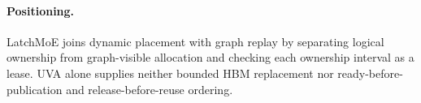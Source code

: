 \paragraph{Positioning.}
LatchMoE joins dynamic placement with graph replay by separating logical
ownership from graph-visible allocation and checking each ownership
interval as a lease. UVA alone supplies neither bounded HBM replacement nor
ready-before-publication and release-before-reuse ordering.
